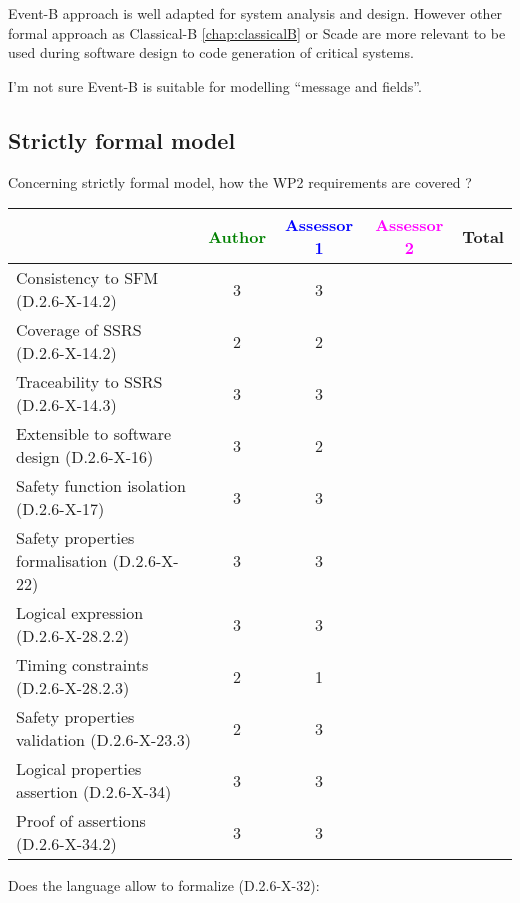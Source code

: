 \begin{author_comment}
Event-B  approach is well adapted for system analysis and design. However other formal approach as Classical-B \ref{chap:classicalB} or Scade are more relevant to be used during software design to code generation of critical systems.
\end{author_comment}


\begin{assessor1}
I'm not sure Event-B is suitable for modelling ``message and fields''.
\end{assessor1}


\subsection{Strictly formal model}

Concerning strictly formal model, how the WP2 requirements are covered ?

\begin{tabular}{|l | c | c | c | c|}
\hline
& \textcolor{green}{Author} & \textcolor{blue}{Assessor 1} & \textcolor{magenta}{Assessor 2} & Total \\
\hline 
Consistency to SFM (D.2.6-X-14.2) & 3 & 3 & &  \\
\hline
Coverage of SSRS (D.2.6-X-14.2)  & 2 & 2 & &  \\
\hline
Traceability to  SSRS (D.2.6-X-14.3)  & 3 & 3 & &  \\
\hline
Extensible to software design (D.2.6-X-16)  & 3 & 2 & &  \\
\hline
Safety function isolation (D.2.6-X-17)  & 3 & 3 & &  \\
\hline 
Safety properties formalisation (D.2.6-X-22)  & 3 & 3 & &  \\
\hline
Logical expression (D.2.6-X-28.2.2)  & 3 & 3 & &  \\
\hline
Timing constraints (D.2.6-X-28.2.3)  & 2 & 1 & &  \\
\hline
Safety properties validation (D.2.6-X-23.3)  & 2 & 3 & &  \\
\hline
Logical properties assertion (D.2.6-X-34)  & 3 & 3 & &  \\
\hline
Proof of assertions (D.2.6-X-34.2)  & 3 & 3 & &  \\
\hline
\end{tabular}

Does the language allow to  formalize (D.2.6-X-32):

